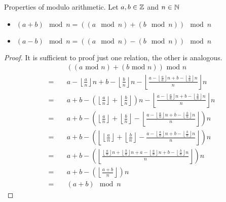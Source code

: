 \begin{corollary}
    Properties of modulo arithmetic. Let $a,b \in \mathbb{Z}$ and $n \in \mathbb{N}$
    \begin{itemize}
        \item $(a + b) \mod n = ((a \mod n) + (b \mod n)) \mod n$
        \item $(a - b) \mod n = ((a \mod n) - (b \mod n)) \mod n$
    \end{itemize}
\end{corollary}
\begin{proof}
    It is sufficient to proof just one relation, the other is analogous.
    \begin{align*}
        & ((a \text{ mod } n) + (b \text{ mod } n)) \text{ mod } n \\
            = \quad & a - \left\lfloor \frac{a}{n} \right\rfloor n + b - \left\lfloor \frac{b}{n} \right\rfloor n - 
                \left\lfloor \frac{a - \left\lfloor \frac{a}{n} \right\rfloor n + b - \left\lfloor \frac{b}{n} \right\rfloor n}{n} \right\rfloor n\\
            = \quad & a + b - \left(\left\lfloor \frac{a}{n} \right\rfloor + \left\lfloor \frac{b}{n} \right\rfloor\right)n - 
                \left\lfloor \frac{a - \left\lfloor \frac{a}{n} \right\rfloor n + b - \left\lfloor \frac{b}{n} \right\rfloor n}{n} \right\rfloor n\\ 
            = \quad & a + b - \left(\left\lfloor \frac{a}{n} \right\rfloor + \left\lfloor \frac{b}{n} \right\rfloor - 
                \left\lfloor \frac{a - \left\lfloor \frac{a}{n} \right\rfloor n + b - \left\lfloor \frac{b}{n} \right\rfloor n}{n} \right\rfloor\right) n\\ 
            = \quad & a + b - \left(\left\lfloor \left\lfloor \frac{a}{n} \right\rfloor + \left\lfloor \frac{b}{n} \right\rfloor - 
                \frac{a - \left\lfloor \frac{a}{n} \right\rfloor n + b - \left\lfloor \frac{b}{n} \right\rfloor n}{n} \right\rfloor\right) n\\
            = \quad & a + b - \left(\left\lfloor
                \frac{\left\lfloor \frac{a}{n} \right\rfloor n + \left\lfloor \frac{b}{n} \right\rfloor n + a - \left\lfloor \frac{a}{n} \right\rfloor n + b - \left\lfloor \frac{b}{n} \right\rfloor n}
                     {n} \right\rfloor\right) n\\  
            = \quad & a + b - \left(\left\lfloor\frac{a + b}{n} \right\rfloor\right) n\\  
            = \quad & (a + b) \mod n  
    \end{align*}
\end{proof}